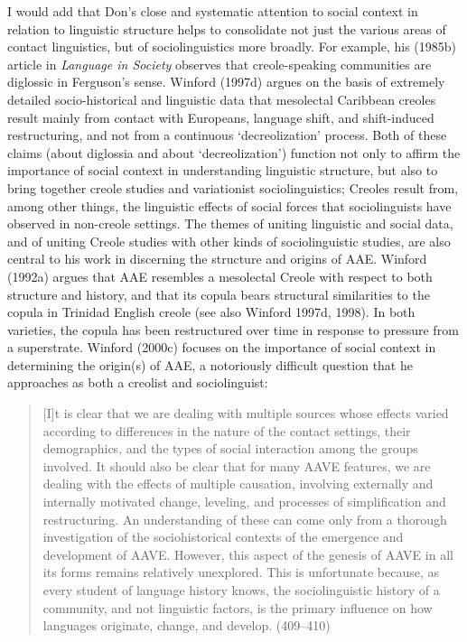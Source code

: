 \documentclass[output=paper, colorlinks,citecolor=brown]{langscibook}
\begin{document}
I would add that Don's close and systematic attention to social context in relation to linguistic structure helps to consolidate not just the various areas of contact linguistics, but of sociolinguistics more broadly. For example, his (1985b) article in \textit{Language in Society} observes that creole-speaking communities are diglossic in Ferguson's sense. Winford (1997d) argues on the basis of extremely detailed socio-historical and linguistic data that mesolectal Caribbean creoles result mainly from contact with Europeans, language shift, and shift-induced restructuring, and not from a continuous ‘decreolization' process. Both of these claims (about diglossia and about ‘decreolization') function not only to affirm the importance of social context in understanding linguistic structure, but also to bring together creole studies and variationist sociolinguistics; Creoles result from, among other things, the linguistic effects of social forces that sociolinguists have observed in non-creole settings.
The themes of uniting linguistic and social data, and of uniting Creole studies with other kinds of sociolinguistic studies, are also central to his work in discerning the structure and origins of AAE. Winford (1992a) argues that AAE resembles a mesolectal Creole with respect to both structure and history, and that its copula bears structural similarities to the copula in Trinidad English creole (see also Winford 1997d, 1998). In both varieties, the copula has been restructured over time in response to pressure from a superstrate. Winford (2000c) focuses on the importance of social context in determining the origin(s) of AAE, a notoriously difficult question that he approaches as both a creolist and sociolinguist:
\begin{quote}
[I]t is clear that we are dealing with multiple sources whose effects varied according to differences in the nature of the contact settings, their demographics, and the types of social interaction among the groups involved. It should also be clear that for many AAVE features, we are dealing with the effects of multiple causation, involving externally and internally motivated change, leveling, and processes of simplification and restructuring. An understanding of these can come only from a thorough investigation of the sociohistorical contexts of the emergence and development of AAVE. However, this aspect of the genesis of AAVE in all its forms remains relatively unexplored. This is unfortunate because, as every student of language history knows, the sociolinguistic history of a community, and not linguistic factors, is the primary influence on how languages originate, change, and develop. (409--410) 
\end{quote}
\end{document}
